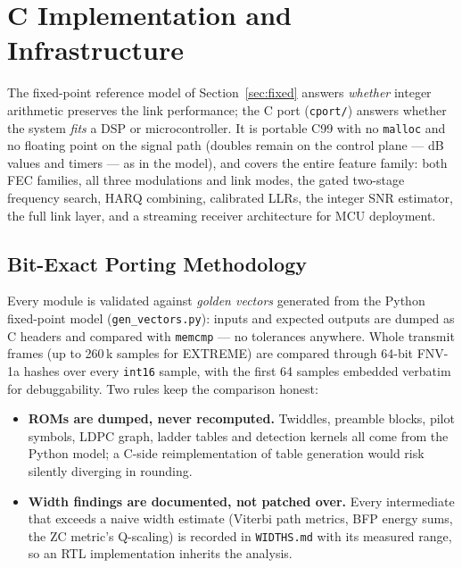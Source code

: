 \section{C Implementation and Infrastructure}
\label{sec:cport}

The fixed-point reference model of Section~\ref{sec:fixed} answers
\emph{whether} integer arithmetic preserves the link performance; the C
port (\texttt{cport/}) answers whether the system \emph{fits} a DSP or
microcontroller.  It is portable C99 with no \texttt{malloc} and no
floating point on the signal path (doubles remain on the control plane
--- dB values and timers --- as in the model), and covers the entire
feature family: both FEC families, all three modulations and link
modes, the gated two-stage frequency search, HARQ combining, calibrated
LLRs, the integer SNR estimator, the full link layer, and a streaming
receiver architecture for MCU deployment.

\subsection{Bit-Exact Porting Methodology}
\label{sec:cport_method}

Every module is validated against \emph{golden vectors} generated from
the Python fixed-point model (\texttt{gen\_vectors.py}): inputs and
expected outputs are dumped as C headers and compared with
\texttt{memcmp} --- no tolerances anywhere.  Whole transmit frames
(up to 260\,k samples for EXTREME) are compared through 64-bit
FNV-1a hashes over every \texttt{int16} sample, with the first 64
samples embedded verbatim for debuggability.  Two rules keep the
comparison honest:

\begin{itemize}
    \item \textbf{ROMs are dumped, never recomputed.}  Twiddles,
          preamble blocks, pilot symbols, LDPC graph, ladder tables and
          detection kernels all come from the Python model; a C-side
          reimplementation of table generation would risk silently
          diverging in rounding.
    \item \textbf{Width findings are documented, not patched over.}
          Every intermediate that exceeds a naive width estimate
          (Viterbi path metrics, BFP energy sums, the ZC metric's
          Q-scaling) is recorded in \texttt{WIDTHS.md} with its measured
          range, so an RTL implementation inherits the analysis.
\end{itemize}

